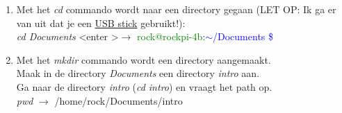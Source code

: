 \begin{enumerate}
\begin{enumerate}
\begin{enumerate}
	\item  Met het \textit{cd} commando wordt naar een directory gegaan\newline
	(LET OP: Ik ga er van uit dat je een \hyperlink{chp:USBstick}{USB stick} gebruikt!):\\  
	\textit{cd Documents} \textless enter \textgreater $\rightarrow$  
	\textcolor{green}{rock@rockpi-4b}:\textcolor{blue}{$\mathtt{\sim}$/Documents \$}
	\item  Met het \textit{mkdir} commando wordt een directory aangemaakt.\\
	Maak in de directory \textit{Documents} een directory \textit{intro} aan.\newline \\
	Ga naar de directory \textit{intro} (\textit{cd intro}) en vraagt het path op.\\
	\textit{pwd}  $\rightarrow$  /home/rock/Documents/intro
	
\end{enumerate}


\end{enumerate}
\end{enumerate}
